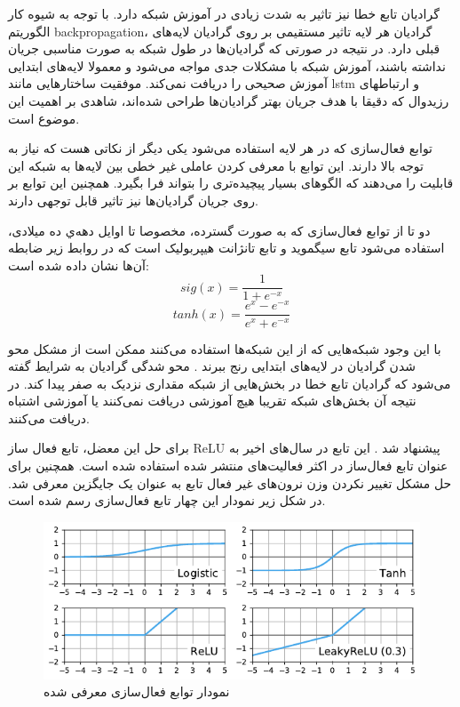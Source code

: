 گرادیان تابع خطا نیز تاثیر به شدت زیادی در آموزش شبکه دارد. با توجه به شیوه کار
الگوریتم \gls{backpropagation}، گرادیان هر لایه تاثیر مستقیمی بر روی گرادیان
لایه‌های قبلی دارد. در نتیجه در صورتی که گرادیان‌ها در طول شبکه به صورت مناسبی
جریان نداشته باشند، آموزش شبکه با مشکلات جدی مواجه می‌شود و معمولا لایه‌های
ابتدایی آموزش صحیحی را دریافت نمی‌کند. موفقیت ساختارهایی مانند \gls{lstm} و
ارتباطهای رزیدوال که دقیقا با هدف جریان بهتر گرادیان‌ها طراحی شده‌اند، شاهدی بر
اهمیت این موضوع است.

توابع فعال‌سازی که در هر لایه استفاده می‌شود یکی دیگر از نکاتی هست که نیاز به
توجه بالا دارند. این توابع با معرفی کردن عاملی غیر خطی بین لایه‌ها به شبکه این
قابلیت را می‌دهند که الگوهای بسیار پیچیده‌تری را بتواند فرا بگیرد. همچنین این
توابع بر روی جریان گرادیان‌ها نیز تاثیر قابل توجهی دارند.

دو تا از توابع فعال‌سازی که به صورت گسترده، مخصوصا تا اوایل دهه‌ي ده میلادی،
استفاده می‌شود تابع سیگموید و تابع  تانژانت هیپربولیک است که در روابط زیر ضابطه
آن‌ها نشان داده شده است:
\begin{equation}
    sig(x) = \frac{1}{1 + e^{-x}}
\end{equation}
\begin{equation}
    tanh(x) = \frac{e^x - e^{-x}}{e^x + e^{-x}}
\end{equation}

با این وجود شبکه‌هایی که از این شبکه‌ها استفاده می‌کنند ممکن است از مشکل محو شدن
گرادیان در لایه‌های ابتدایی رنج ببرند \cite{bengio1994learning}. محو شدگی
گرادیان به شرایط گفته می‌شود که گرادیان تابع خطا در بخش‌هایی از شبکه مقداری
نزدیک به صفر پیدا کند. در نتیجه آن بخش‌های شبکه تقریبا هیچ آموزشی دریافت
نمی‌کنند یا آموزشی اشتباه دریافت می‌کنند.

برای حل این معضل، تابع فعال ساز ReLU پیشنهاد شد \cite{glorot2011deep}. این تابع
در سال‌های اخیر به عنوان تابع فعال‌ساز در اکثر فعالیت‌های منتشر شده استفاده شده
است. همچنین برای حل مشکل تغییر نکردن وزن نرون‌های غیر فعال تابع 
به عنوان یک جایگزین معرفی شد. در شکل زیر نمودار این چهار تابع فعال‌سازی رسم شده
است.
\begin{figure}[ht]
    \centering
    \includegraphics[width=12cm]{./statics/activation_functions.png}
    \caption{نمودار توابع فعال‌سازی معرفی شده}
\end{figure}

